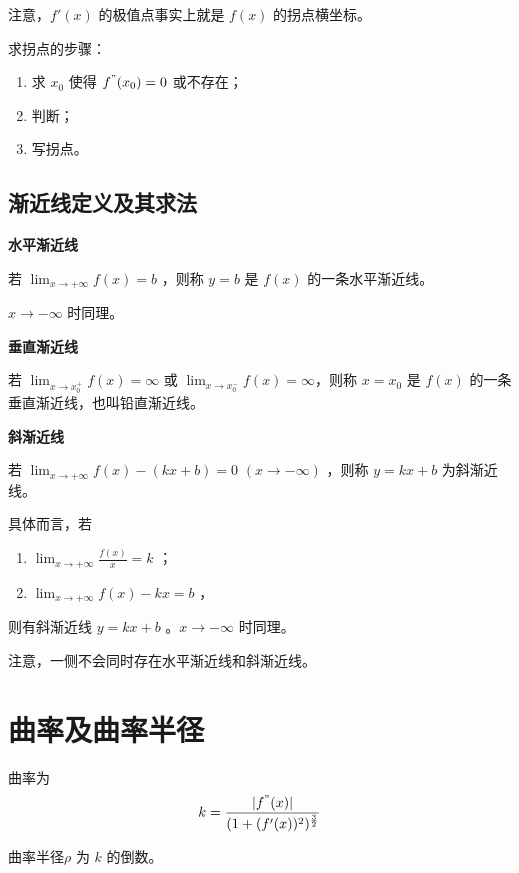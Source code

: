 注意，$ f'(x) $ 的极值点事实上就是 $ f(x) $ 的拐点横坐标。

求拐点的步骤：\begin{enumerate}
    \item 求 $ x_0 $ 使得 $ f^"(x_0)=0 $ 或不存在；
    \item 判断；
    \item 写拐点。
\end{enumerate}

\subsection{渐近线定义及其求法}

\textbf{水平渐近线}

若 $ {\displaystyle\lim_{x\rightarrow +\infty}}f(x)=b $ ，则称 $ y=b $ 是 $ f(x) $ 的一条水平渐近线。

$ x\rightarrow-\infty $ 时同理。


\textbf{垂直渐近线}

若 $ {\displaystyle\lim_{x\rightarrow x_0^+}}f(x)=\infty $ 
或 $ {\displaystyle\lim_{x\rightarrow x_0^-}}f(x)=\infty $，则称 $ x=x_0 $ 是 $ f(x) $ 的一条垂直渐近线，也叫铅直渐近线。

\textbf{斜渐近线} 

若 $ {\displaystyle\lim_{x\rightarrow +\infty}}f(x)-(kx+b)=0 $ $ (x\rightarrow-\infty) $ ，则称
$ y=kx+b $ 为斜渐近线。

具体而言，若\begin{enumerate}
    \item $ {\displaystyle\lim_{x\rightarrow +\infty}}\frac{f(x)}{x}=k $ ；
    \item $ {\displaystyle\lim_{x\rightarrow +\infty}}f(x)-kx = b $ ，
\end{enumerate}
则有斜渐近线 $ y=kx+b $ 。$ x\rightarrow-\infty $ 时同理。

注意，一侧不会同时存在水平渐近线和斜渐近线。

\section{曲率及曲率半径}

曲率为$$
   k=\frac{|f^"(x)|}{(1+(f'(x))^2)^{\frac{3}{2}}}
$$ 

曲率半径$ \rho $ 为 $ k $ 的倒数。